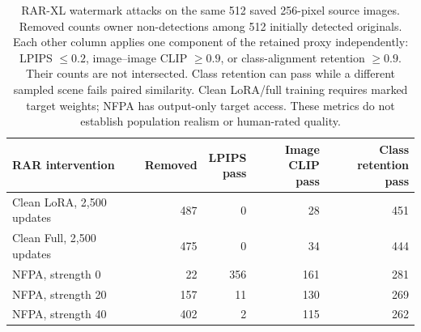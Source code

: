 \begin{table}[ht]\centering\small
\begin{tabular}{lrrrr}\toprule
RAR intervention & Removed & \shortstack{LPIPS\\pass} & \shortstack{Image CLIP\\pass} & \shortstack{Class retention\\pass}\\\midrule
Clean LoRA, 2,500 updates & 487 & 0 & 28 & 451 \\
Clean Full, 2,500 updates & 475 & 0 & 34 & 444 \\
NFPA, strength 0 & 22 & 356 & 161 & 281 \\
NFPA, strength 20 & 157 & 11 & 130 & 269 \\
NFPA, strength 40 & 402 & 2 & 115 & 262 \\
\bottomrule\end{tabular}
\caption{RAR-XL watermark attacks on the same 512 saved 256-pixel source images. Removed counts owner non-detections among 512 initially detected originals. Each other column applies one component of the retained proxy independently: LPIPS $\leq0.2$, image--image CLIP $\geq0.9$, or class-alignment retention $\geq0.9$. Their counts are not intersected. Class retention can pass while a different sampled scene fails paired similarity. Clean LoRA/full training requires marked target weights; NFPA has output-only target access. These metrics do not establish population realism or human-rated quality.}\label{tab:rar-proxy-components}\end{table}
